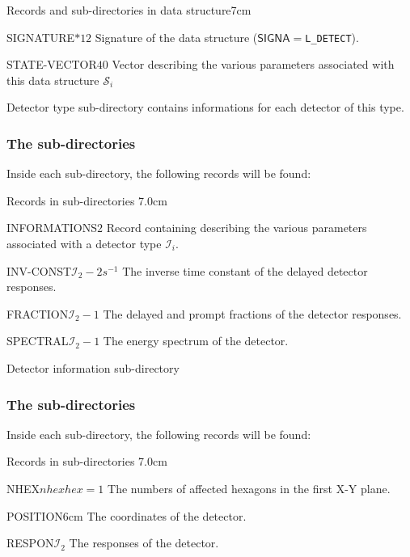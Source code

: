 \begin{DescriptionEnregistrement}{Records and sub-directories in 
data structure}{7cm} 

\CharEnr
{SIGNATURE}{$*12$}
{Signature of the  data structure ($\mathsf{SIGNA}=${\tt L\_DETECT}).}

\IntEnr
{STATE-VECTOR}{$40$}
{Vector describing the various parameters associated with this data structure $\mathcal{S}_i$}

\DirVar
{}
{Detector type sub-directory contains informations
for each detector of this type.}

\end{DescriptionEnregistrement}

\subsubsection{The  sub-directories}\label{sect:nametype}

\noindent
Inside each  sub-directory, the following records will be found:

\begin{DescriptionEnregistrement}{Records in  sub-directories}
{7.0cm} \label{tabl:tabdet}

\IntEnr
{INFORMATIONS}{$2$}
{Record containing describing the various parameters associated with a
  detector type $\mathcal{I}_{i}$.}

\OptRealEnr
{INV-CONST}{$\mathcal{I}_2 -2$}{}{$s^{-1}$}
{The inverse time constant of the
delayed detector responses.}

\OptRealEnr
{FRACTION}{$\mathcal{I}_2 -1$}{}{}
{The delayed and prompt fractions
of the detector responses.}

\RealEnr
{SPECTRAL}{$\mathcal{I}_2 -1$}{}
{The energy spectrum of the
detector.}

\DirVar
{}
{Detector information sub-directory}


\end{DescriptionEnregistrement}

\subsubsection{The  sub-directories}\label{sect:detector}

\noindent
Inside each  sub-directory, the following records will be found:

\begin{DescriptionEnregistrement}{Records in  sub-directories}
{7.0cm} \label{tabl:tabrodgroup}

\OptIntEnr
{NHEX}{$nhex$}{$hex=1$}
{The numbers of affected hexagons in the first X-Y plane.}

\RealEnr
{POSITION}{$6$}{cm}
{The coordinates of the 
detector.}

\RealEnr
{RESPON}{$\mathcal{I}_2$}{}
{The responses of the detector.}

\end{DescriptionEnregistrement}
\clearpage
